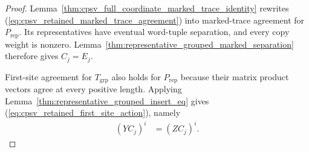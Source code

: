 \begin{proof}\leanok
    Lemma~\ref{thm:cpsv_full_coordinate_marked_trace_identity} rewrites
    (\ref{eq:cpsv_retained_marked_trace_agreement}) into marked-trace
    agreement for $P_{\mathrm{rep}}$. Its representatives have eventual
    word-tuple separation, and every copy weight is nonzero. Lemma~\ref{thm:representative_grouped_marked_separation}
    therefore gives $C_j=E_j$.

    First-site agreement for $T_{\mathrm{grp}}$ also holds for
    $P_{\mathrm{rep}}$ because their matrix product vectors agree at every
    positive length. Applying
    Lemma~\ref{thm:representative_grouped_insert_eq} gives
    (\ref{eq:cpsv_retained_first_site_action}), namely
    \begin{align}
        (YC_j)^i & =(ZC_j)^i.
        \label{eq:cpsv_prop_4_13_active_separation}
    \end{align}
\end{proof}

